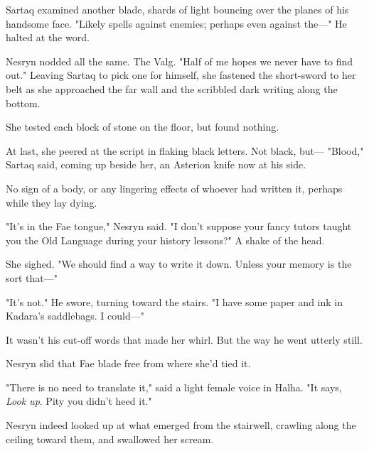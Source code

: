 Sartaq examined another blade, shards of light bouncing over the planes of his handsome face.
"Likely spells against enemies; perhaps even against the---" He halted at the word.

Nesryn nodded all the same.
The Valg.
"Half of me hopes we never have to find out."
Leaving Sartaq to pick one for himself, she fastened the short-sword to her belt as she approached the far wall and the scribbled dark writing along the bottom.

She tested each block of stone on the floor, but found nothing.

At last, she peered at the script in flaking black letters.
Not black, but--- "Blood," Sartaq said, coming up beside her, an Asterion knife now at his side.

No sign of a body, or any lingering effects of whoever had written it, perhaps while they lay dying.

"It's in the Fae tongue," Nesryn said.
"I don't suppose your fancy tutors taught you the Old Language during your history lessons?"
A shake of the head.

She sighed.
"We should find a way to write it down.
Unless your memory is the sort that---"

"It's not."
He swore, turning toward the stairs.
"I have some paper and ink in Kadara's saddlebags.
I could---"

It wasn't his cut-off words that made her whirl.
But the way he went utterly still.

Nesryn slid that Fae blade free from where she'd tied it.

"There is no need to translate it," said a light female voice in Halha.
"It says, \emph{Look up}.
Pity you didn't heed it."

Nesryn indeed looked up at what emerged from the stairwell, crawling along the ceiling toward them, and swallowed her scream.

